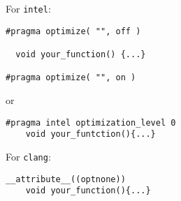 \documentclass[10pt, a4paper, english, parskip, twocolumn]{scrartcl}
\newcommand{\code}[1]{\texttt{#1}}
\begin{document}
For \code{intel}:
\begin{lstlisting}[belowskip=-0.8 \baselineskip]
#pragma optimize( "", off )

  void your_function() {...}

#pragma optimize( "", on )
\end{lstlisting}
\quad\quad or
\begin{lstlisting}[belowskip=-0.8 \baselineskip]
#pragma intel optimization_level 0
	void your_funtction(){...}
\end{lstlisting}
%

For \code{clang}:
\begin{lstlisting}[belowskip=-0.8 \baselineskip]
__attribute__((optnone))
	void your_function(){...}
\end{lstlisting}
\end{document}
